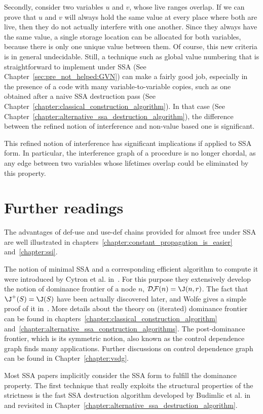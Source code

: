 Secondly, consider two variables $u$ and $v$, whose live ranges overlap.
If we can prove that $u$ and $v$ will always hold the same value
at every place where both are live, then they do not actually interfere
with one another. Since they always have the same value, a single 
storage location can be allocated for both variables, because there
is only one unique value between them. 
Of course, this new criteria is in general undecidable.
Still, a technique such as global value numbering that is straightforward to implement under SSA (See Chapter~\ref{sec:pre_not_helped:GVN}) can make a fairly good job, especially in the presence of a code with many variable-to-variable copies, such as one obtained after a naive 
SSA destruction pass (See Chapter~\ref{chapter:classical_construction_algorithm}).
In that case (See Chapter~\ref{chapter:alternative_ssa_destruction_algorithm}), the difference between the refined notion of interference and non-value based one is significant. 

This refined notion of interference has significant implications if
applied to SSA form. In particular, the interference graph of a procedure
is no longer chordal, as any edge between two variables whose lifetimes
overlap could be eliminated by this property. 


\section{Further readings}
The advantages of def-use and use-def chains provided for almost free under SSA are well illustrated in chapters~\ref{chapter:constant_propagation_is_easier} and~\ref{chapter:ssi}.

The notion of minimal SSA and a corresponding efficient algorithm to compute it were introduced by Cytron et al. in~\cite{CytronOct91}. For this purpose they extensively develop the notion of dominance frontier of a node $n$, ${\cal DF}(n)=\J(n,r)$. The fact that $\J^+(S)=\J(S)$ have been actually discovered later, and Wolfe gives a simple proof of it in~\cite{WolfeJul94}. More details about the theory on (iterated) dominance frontier can be found in chapters~\ref{chapter:classical_construction_algorithm} and~\ref{chapter:alternative_ssa_construction_algorithms}. The post-dominance frontier, which is its symmetric notion, also known as the control dependence graph finds many applications. Further discussions on control dependence graph can be found in Chapter~\ref{chapter:vsdg}. 

Most SSA papers implicitly consider the SSA form to fulfill the dominance property. The first technique that really exploits the structural properties of the strictness is the fast SSA destruction algorithm developed by Budimlic et al. in~\cite{BudimlicJun02} and revisited in Chapter~\ref{chapter:alternative_ssa_destruction_algorithm}. 

